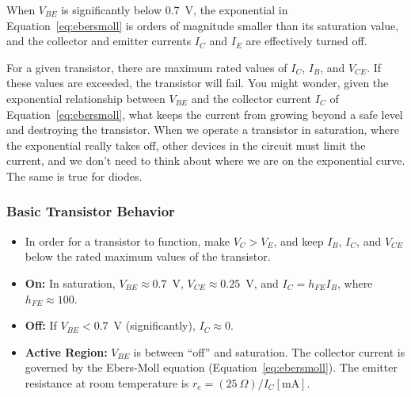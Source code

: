 \documentclass[11pt]{article}
\begin{document}
When $V_{BE}$ is significantly below 0.7~V, the exponential in
Equation~\ref{eq:ebersmoll} is orders of magnitude smaller than its
saturation value, and the collector and emitter currents $I_C$ and
$I_E$ are effectively turned off. 

For a given transistor, there are maximum rated values of $I_C$,
$I_B$, and $V_{CE}$. If these values are exceeded, the transistor will
fail. You might wonder, given the exponential relationship between
$V_{BE}$ and the collector current $I_C$ of
Equation~\ref{eq:ebersmoll}, what keeps the current from growing
beyond a safe level and destroying the transistor. When we operate a
transistor in saturation, where the exponential really takes off,
other devices in the circuit must limit the current, and we don't need
to think about where we are on the exponential curve. The same is true
for diodes.

\htmlrule
\begin{latexonly}
  \noindent
  \hrulefill
\end{latexonly}
\subsubsection*{Basic Transistor Behavior}
\begin{itemize}
\item In order for a transistor to function, make $V_C > V_E$, and
  keep $I_B$, $I_C$, and $V_{CE}$ below the rated maximum
  values of the transistor.

\item \textbf{On:} In saturation, $V_{BE} \approx 0.7$~V,
  $V_{CE} \approx 0.25$~V, and $I_C = h_{FE} I_B$, where
  $h_{FE} \approx 100$. 

\item \textbf{Off:} If $V_{BE} < 0.7$~V (significantly),
  $I_C \approx 0$.

\item \textbf{Active Region:} $V_{BE}$ is between ``off'' and
  saturation. The collector current is governed by the Ebers-Moll
  equation (Equation~\ref{eq:ebersmoll}). The emitter resistance
  at room temperature is $r_e = (25~\Omega)/I_C[\mathrm{mA}]$.
\end{itemize}
\begin{latexonly}
  \noindent
  \hrulefill
\end{latexonly}
\htmlrule
\end{document}
